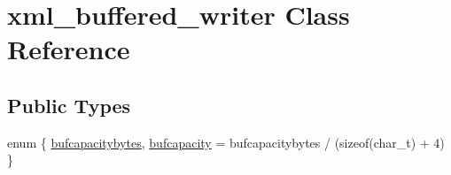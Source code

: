 \hypertarget{classxml__buffered__writer}{
\section{xml\_\-buffered\_\-writer Class Reference}
\label{classxml__buffered__writer}
}
\subsection*{Public Types}
\begin{DoxyCompactItemize}
\item 
enum \{ \hyperlink{classxml__buffered__writer_a684aec07739ea6e60d47440eee97b4f6a9021e7b22ef17fba93b80380f0ffbbc8}{bufcapacitybytes}, 
\hyperlink{classxml__buffered__writer_a684aec07739ea6e60d47440eee97b4f6ab8b49b73105796783607f1f1ddd382cd}{bufcapacity} =  bufcapacitybytes / (sizeof(char\_\-t) + 4)
 \}
\end{DoxyCompactItemize}
